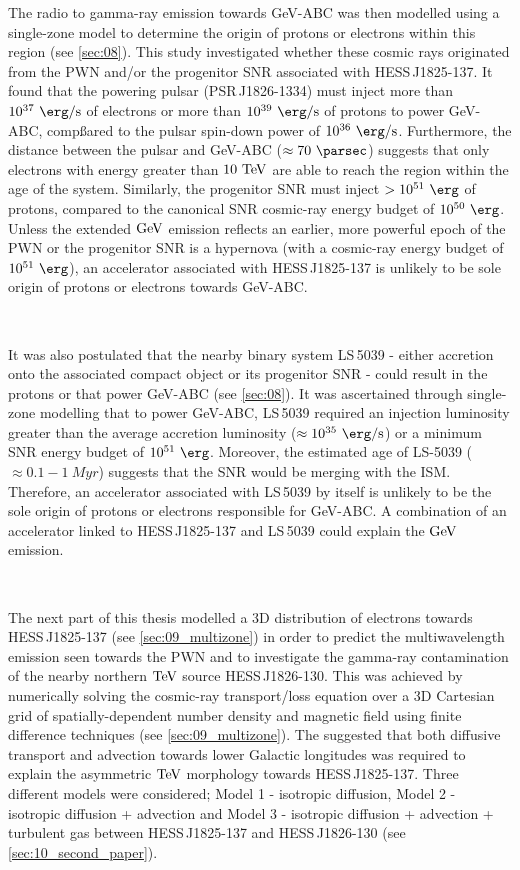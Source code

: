 The radio to gamma-ray emission towards \mbox{GeV-ABC} was then modelled using a single-zone model to determine the origin of protons or electrons within this region (see \autoref{sec:08}). This study investigated whether these cosmic rays originated from the PWN and/or the progenitor SNR associated with \mbox{HESS\,J1825-137}. It found that the powering pulsar (\mbox{PSR\,J1826-1334}) must inject more than {$10^{37}~\ergspersec$} of electrons or more than $10^{39}~\ergspersec$ of protons to power \mbox{GeV-ABC}, compßared to the pulsar spin-down power of $10^{36}~\ergspersec$. Furthermore, the distance between the pulsar and GeV-ABC ($\approx 70~\pc$) suggests that only electrons with energy greater than $10~\TeV$ are able to reach the region within the age of the system. Similarly, the progenitor SNR must inject $>10^{51}~\ergs$ of protons, compared to the canonical SNR cosmic-ray energy budget of $10^{50}~\ergs$. Unless the extended $\si{\giga\electronvolt}$ emission reflects an earlier, more powerful epoch of the PWN or the progenitor SNR is a hypernova (with a cosmic-ray energy budget of $10^{51}~\ergs$), an accelerator associated with \mbox{HESS\,J1825-137} is unlikely to be sole origin of protons or electrons towards \mbox{GeV-ABC}.
\par~\par 
It was also postulated that the nearby binary system \mbox{LS\,5039} - either accretion onto the associated compact object or its progenitor SNR - could result in the protons or that power \mbox{GeV-ABC} (see \autoref{sec:08}). It was ascertained through single-zone modelling that to power GeV-ABC, \mbox{LS\,5039} required an injection luminosity greater than the average accretion luminosity ($\approx 10^{35}~\ergspersec$) or a minimum SNR energy budget of $10^{51}~\ergs$. Moreover, the estimated age of \mbox{LS-5039} ($\approx 0.1-1~\si{Myr}$) suggests that the SNR would be merging with the ISM. Therefore, an accelerator associated with \mbox{LS\,5039} by itself is unlikely to be the sole origin of protons or electrons responsible for GeV-ABC. A combination of an accelerator linked to \mbox{HESS\,J1825-137} and \mbox{LS\,5039} could explain the $\si{\giga\electronvolt}$ emission.
\par~\par
The next part of this thesis modelled a 3D distribution of electrons towards \mbox{HESS\,J1825-137} (see \autoref{sec:09_multizone}) in order to predict the multiwavelength emission seen towards the PWN and to investigate the gamma-ray contamination of the nearby northern $\TeV$ source \mbox{HESS\,J1826-130}. This was achieved by numerically solving the cosmic-ray transport/loss equation over a 3D Cartesian grid of spatially-dependent number density and magnetic field using finite difference techniques (see \autoref{sec:09_multizone}). The \cite{2019A&A...621A.116H} suggested that both diffusive transport and advection towards lower Galactic longitudes was required to explain the asymmetric $\TeV$ morphology towards \mbox{HESS\,J1825-137}. Three different models were considered; Model 1 - isotropic diffusion, Model 2 - isotropic diffusion + advection and Model 3 - isotropic diffusion + advection + turbulent gas between \mbox{HESS\,J1825-137} and \mbox{HESS\,J1826-130} (see \autoref{sec:10_second_paper}).
